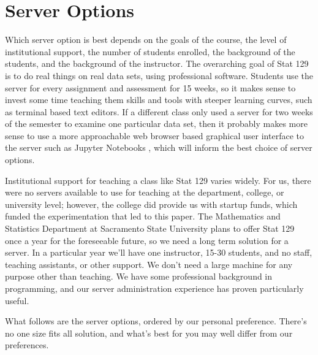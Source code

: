 \documentclass[12pt]{article}
\begin{document}
\section{Server Options}


Which server option is best depends on the goals of the course, the level of institutional support, the number of students enrolled, the background of the students, and the background of the instructor.
The overarching goal of Stat 129 is to do real things on real data sets, using professional software.
Students use the server for every assignment and assessment for 15 weeks, so it makes sense to invest some time teaching them skills and tools with steeper learning curves, such as terminal based text editors.
If a different class only used a server for two weeks of the semester to examine one particular data set, then it probably makes more sense to use a more approachable web browser based graphical user interface to the server such as Jupyter Notebooks \cite{kluyver2016jupyter}, which will inform the best choice of server options.

Institutional support for teaching a class like Stat 129 varies widely.
For us, there were no servers available to use for teaching at the department, college, or university level; however, the college did provide us with startup funds, which funded the experimentation that led to this paper.
The Mathematics and Statistics Department at Sacramento State University plans to offer Stat 129 once a year for the foreseeable future, so we need a long term solution for a server.
In a particular year we'll have one instructor, 15-30 students, and no staff, teaching assistants, or other support.
We don't need a large machine for any purpose other than teaching.
We have some professional background in programming, and our server administration experience has proven particularly useful.

What follows are the server options, ordered by our personal preference.
There's no one size fits all solution, and what's best for you may well differ from our preferences.



\end{document}
